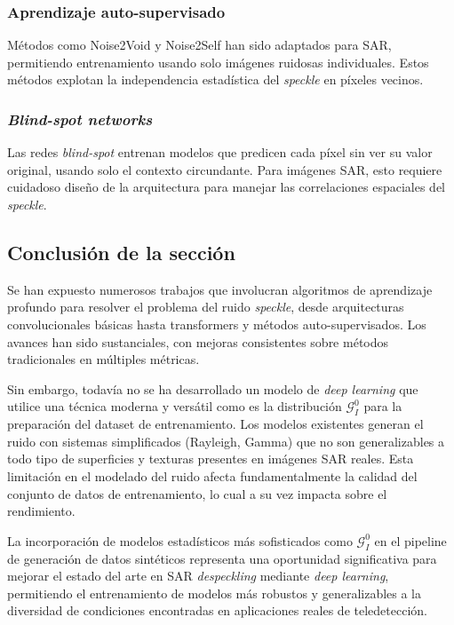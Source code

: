\subsubsection{Aprendizaje auto-supervisado}

Métodos como Noise2Void \cite{krull2019noise2void} y Noise2Self \cite{batson2019noise2self} han sido adaptados para SAR, permitiendo entrenamiento usando solo imágenes ruidosas individuales. Estos métodos explotan la independencia estadística del \emph{speckle} en píxeles vecinos.

\subsubsection{\emph{Blind-spot networks}}

Las redes \emph{blind-spot} \cite{laine2019high} entrenan modelos que predicen cada píxel sin ver su valor original, usando solo el contexto circundante. Para imágenes SAR, esto requiere cuidadoso diseño de la arquitectura para manejar las correlaciones espaciales del \emph{speckle}.

\subsection{Conclusión de la sección}

Se han expuesto numerosos trabajos que involucran algoritmos de aprendizaje profundo para resolver el problema del ruido \emph{speckle}, desde arquitecturas convolucionales básicas hasta transformers y métodos auto-supervisados. Los avances han sido sustanciales, con mejoras consistentes sobre métodos tradicionales en múltiples métricas.

Sin embargo, todavía no se ha desarrollado un modelo de \emph{deep learning} que utilice una técnica moderna y versátil como es la distribución $\mathcal{G}_I^0$ para la preparación del dataset de entrenamiento. Los modelos existentes generan el ruido con sistemas simplificados (Rayleigh, Gamma) que no son generalizables a todo tipo de superficies y texturas presentes en imágenes SAR reales. Esta limitación en el modelado del ruido afecta fundamentalmente la calidad del conjunto de datos de entrenamiento, lo cual a su vez impacta sobre el rendimiento.

La incorporación de modelos estadísticos más sofisticados como $\mathcal{G}_I^0$ en el pipeline de generación de datos sintéticos representa una oportunidad significativa para mejorar el estado del arte en SAR \emph{despeckling} mediante \emph{deep learning}, permitiendo el entrenamiento de modelos más robustos y generalizables a la diversidad de condiciones encontradas en aplicaciones reales de teledetección.
